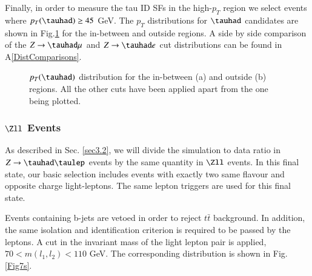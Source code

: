 Finally, in order to measure the tau ID SFs in the high-$p_T$ region we select events where $p_T(\tauhad)\geq 45$ GeV. The $p_T$ distributions for $\tauhad$ candidates are shown in Fig.\ref{Fig6} for the in-between and outside regions. A side by side comparison of the $Z\to\tauhad\mu$ and $Z\to\tauhad e$ cut distributions can be found in A\ref{DistComparisons}.
\begin{figure}[htbp]
	\centering
	\hfill
	\caption{$p_T(\tauhad)$ distribution for the in-between (a) and outside (b) regions. All the other cuts have been applied apart from the one being plotted.}
	\label{Fig6}
\end{figure} 
\subsubsection{$\Zll$ Events}\label{sec3.3.2}
As described in Sec. \ref{sec3.2}, we will divide the simulation to data ratio in $Z\to\tauhad\taulep$ events by the same quantity in $\Zll$ events. In this final state, our basic selection includes events with exactly two same flavour and opposite charge light-leptons. The same lepton triggers are used for this final state.

Events containing b-jets are vetoed in order to reject $t\bar{t}$ background. In addition, the same isolation and identification criterion is required to be passed by the leptons. A cut in the invariant mass of the light lepton pair is applied, $70<m(l_1,l_2)<110$ GeV. The corresponding distribution is shown in Fig. \ref{Fig7s}.

